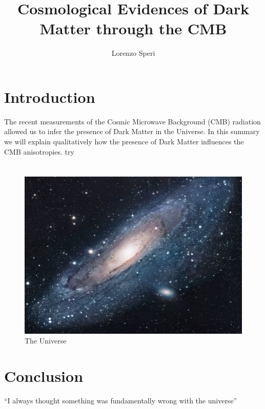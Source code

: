 \documentclass{article}
\title{Cosmological Evidences of Dark Matter through the CMB}
\author{Lorenzo Speri}
\date{}
\begin{document}
\maketitle


\section{Introduction}
The recent measurements of the Cosmic Microwave Background (CMB) radiation allowed us to infer the presence of Dark Matter in the Universe. In this summary we will explain qualitatively how the presence of Dark Matter influences the CMB anisotropies.
try
\section{}

\begin{figure}[h!]
\centering
\includegraphics[scale=1.7]{universe}
\caption{The Universe}
\label{fig:universe}
\end{figure}

\section{Conclusion}
``I always thought something was fundamentally wrong with the universe'' \citep{adams1995hitchhiker}



\end{document}
